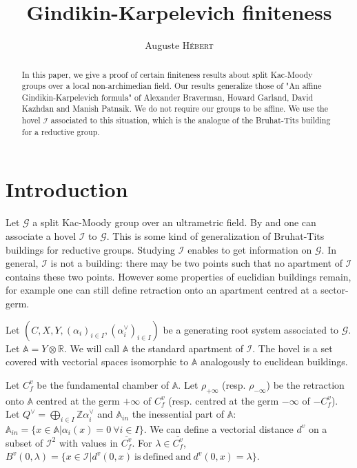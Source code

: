 \documentclass[12pt]{article}
\date{}
\title{Gindikin-Karpelevich finiteness}
\author{Auguste \textsc{Hébert}}
\theoremstyle{plain}
\theoremstyle{definition}
\newcommand{\R}{\mathbb{R}}
\newcommand{\A}{\mathbb{A}}
\newcommand{\Z}{\mathbb{Z}}
\newcommand{\I}{\mathcal{I}}
\begin{document}
\maketitle


\begin{abstract}
In this paper, we give a proof of certain finiteness results about split Kac-Moody groups over a local non-archimedian field. Our results generalize those of "An affine Gindikin-Karpelevich formula" of Alexander Braverman, Howard Garland, David Kazhdan and Manish Patnaik. We do not require our groups to be affine. We use the hovel $\I$ associated to this situation, which is the analogue of the Bruhat-Tits building for a reductive group.
\end{abstract}

\section{Introduction}

Let $\mathcal{G}$ a split Kac-Moody group over an ultrametric field. By \cite{gaussent2008kac} and \cite{rousseau2012almost} one can associate a hovel $\I$ to $\mathcal{G}$. This is some kind of generalization of Bruhat-Tits buildings for reductive groups. Studying $\I$ enables to get information on $\mathcal{G}$. In general, $\I$ is not a building: there may be two points such that no apartment of $\I$ contains these two points. However some properties of euclidian buildings remain, for example one can still define retraction onto an apartment centred at a sector-germ.


Let $(C,X,Y,(\alpha_i)_{i\in I},(\alpha_i^\vee)_{i\in I})$ be a generating root system associated to $\mathcal{G}$.  Let $\A=Y\otimes \R$. We will call $\A$ the standard apartment of $\I$. The hovel is a set covered with vectorial spaces isomorphic to $\A$ analogously to euclidean buildings. 




Let $C_f^v$ be the fundamental chamber of $\A$. Let $\rho_{+\infty}$ (resp. $\rho_{-\infty}$) be the retraction onto $\A$ centred at the germ $+\infty$ of $C_f^v$ (resp. centred at the germ $-\infty$ of $-C_f^v$). Let $Q^\vee=\bigoplus_{i\in I} \Z \alpha_i^\vee$ and $\A_{in}$ the inessential part of $\A$: $\A_{in}=\{x\in \A |\alpha_i(x)=0\ \forall i\in I\}$. We can define a vectorial distance $d^v$ on a subset of $\I^2$ with values in $\overline{C_f^v}$. For $\lambda\in \overline{C_f^v}$, $B^v(0,\lambda)=\{x\in\I|d^v(0,x)\mathrm{\ is\ defined\ and\ }d^v(0,x)=\lambda\}$.
\end{document}
